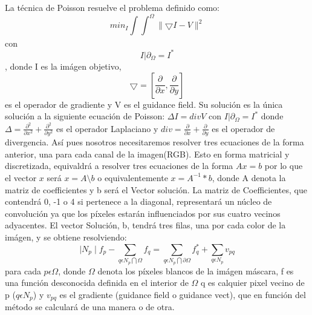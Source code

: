 \documentclass[oneside]{article}
\begin{document}
\begin{multicols}{2}
La técnica de Poisson resuelve el problema definido como: \[min_{I}\int \int_{}^{\Omega } \parallel \bigtriangledown I-V\parallel^{2}\] con \[I|\partial_{\Omega}=I^{*}\], donde
I es la imágen objetivo, \[\bigtriangledown =\left [\frac{\partial }{\partial x},\frac{\partial }{\partial y} \right ]\]
es el operador de gradiente y V es el guidance field. Su solución es la única solución a la siguiente ecuación de Poisson: \newline
$\Delta I=div V$ con $I|\partial_{\Omega}=I^{*}$ donde $\Delta=\frac{\partial^2 }{\partial x^2}+\frac{\partial^2 }{\partial y^2}$ es el operador
Laplaciano y $div=\frac{\partial }{\partial x}+\frac{\partial }{\partial y}$ es el operador de divergencia. \newline
Así pues nosotros necesitaremos resolver tres ecuaciones de la forma anterior, una para cada canal de la imagen(RGB). \newline
Esto en forma matricial y discretizada, equivaldrá a resolver tres ecuaciones de la forma $Ax=b$ por lo que el vector $x$ será $x=A\setminus b$ o equivalentemente $x=A ^{-1}*b$, donde A denota la matriz de coefficientes y b será el Vector solución. \newline
La matriz de Coefficientes, que contendrá 0, -1 o 4 si pertenece a la diagonal, representará un núcleo de convolución ya que los píxeles estarán influenciados
por sus cuatro vecinos adyacentes. \newline
El vector Solución, b, tendrá tres filas, una por cada color de la imágen, y se obtiene resolviendo:
\[\mid N_{p} \mid f_{p}-\sum_{q\epsilon N_{p}\bigcap \Omega} f_{q}=\sum_{q\epsilon N_{p}\bigcap \partial\Omega}f^{*}_{q}+\sum_{q\epsilon N_{p}}v_{pq}\]
para cada $ p \epsilon \Omega$, donde $\Omega$ denota los píxeles blancos de la imágen máscara, f es una función desconocida definida en el interior de $\Omega$
q es calquier pixel vecino de p ($q \epsilon N_{p}$) y $v_{pq}$ es el gradiente (guidance field o guidance vect), que en función del método
se calculará de una manera o de otra. \newline


\end{multicols}
\end{document}
